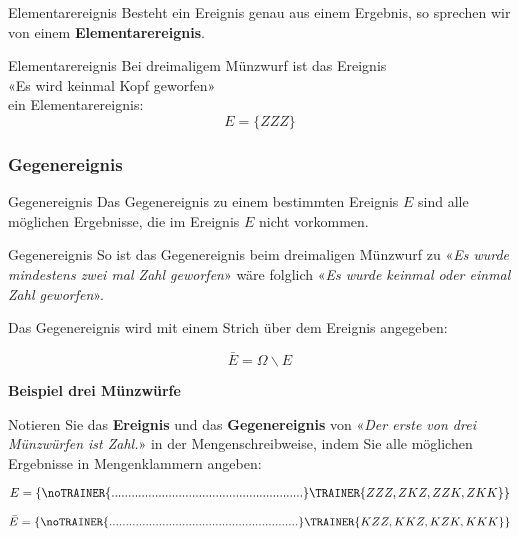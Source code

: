 \begin{definition}{Elementarereignis}{}
Besteht ein Ereignis genau aus einem Ergebnis, so sprechen wir von einem \textbf{Elementarereignis}.
\end{definition}

\begin{beispiel}{Elementarereignis}{}
  Bei dreimaligem Münzwurf ist das Ereignis\\
  «Es wird keinmal Kopf geworfen»\\
  ein Elementarereignis:\\

  $$E = \{ZZZ\}$$
\end{beispiel}




\newpage
\subsubsection{Gegenereignis}
\begin{definition}{Gegenereignis}{}
  Das Gegenereignis zu einem bestimmten Ereignis $E$ sind alle möglichen Ergebnisse,
  die im Ereignis $E$ nicht vorkommen.
\end{definition}

\begin{beispiel}{Gegenereignis}{}
So ist das Gegenereignis beim dreimaligen Münzwurf zu «\textit{Es wurde mindestens zwei mal Zahl
geworfen}» wäre folglich «\textit{Es wurde keinmal oder einmal Zahl geworfen}».
\end{beispiel}

\vspace{2mm}


\begin{definition}{}{}
Das Gegenereignis wird mit einem Strich über dem Ereignis angegeben:

$$\bar{E} = \Omega \backslash E$$
\end{definition}

\textbf{Beispiel drei Münzwürfe}

Notieren Sie das \textbf{Ereignis} und das \textbf{Gegenereignis} von «\textit{Der erste von drei Münzwürfen
  ist Zahl.}» in der Mengenschreibweise, indem Sie alle
möglichen Ergebnisse in Mengenklammern angeben:

$$E = \{
\noTRAINER{.........................................................}\TRAINER{ZZZ,
ZKZ, ZZK, ZKK\}}$$

$$\bar{E} = \{
\noTRAINER{.........................................................}\TRAINER{KZZ,
KKZ, KZK, KKK\}}$$


